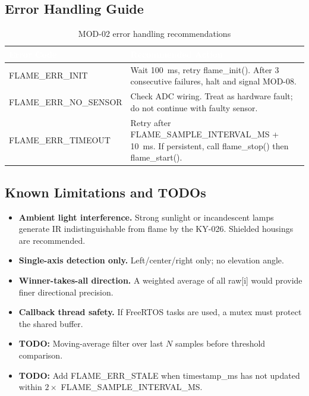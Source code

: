 \documentclass[12pt,a4paper]{article}
\newcommand{\theadtext}[1]{\textcolor{white}{\textbf{#1}}}
\newcommand{\fn}[1]{{\footnotesize\ttfamily #1}}
\begin{document}
\subsection{Error Handling Guide}

\begin{table}[H]\centering\small
\begin{tabularx}{\textwidth}{L{4.5cm} X}
\toprule
{}\theadtext{Error Code} & \theadtext{Recommended Action} \\
\midrule
{}   \fn{FLAME\_ERR\_INIT}       & Wait 100~ms, retry \fn{flame\_init()}. After 3 consecutive failures, halt and signal MOD-08. \\
 \fn{FLAME\_ERR\_NO\_SENSOR} & Check ADC wiring. Treat as hardware fault; do not continue with faulty sensor. \\
   \fn{FLAME\_ERR\_TIMEOUT}    & Retry after \fn{FLAME\_SAMPLE\_INTERVAL\_MS + 10}~ms. If persistent, call \fn{flame\_stop()} then \fn{flame\_start()}. \\
\bottomrule
\end{tabularx}
\caption{MOD-02 error handling recommendations}
\end{table}


\subsection{Known Limitations and TODOs}

\begin{itemize}[leftmargin=1.5em]
  \item \textbf{Ambient light interference.} Strong sunlight or incandescent lamps generate IR indistinguishable from flame by the KY-026. Shielded housings are recommended.
  \item \textbf{Single-axis detection only.} Left/center/right only; no elevation angle.
  \item \textbf{Winner-takes-all direction.} A weighted average of all \fn{raw[i]} would provide finer directional precision.
  \item \textbf{Callback thread safety.} If FreeRTOS tasks are used, a mutex must protect the shared buffer.
  \item \textbf{TODO:} Moving-average filter over last $N$ samples before threshold comparison.
  \item \textbf{TODO:} Add \fn{FLAME\_ERR\_STALE} when \fn{timestamp\_ms} has not updated within $2 \times$ \fn{FLAME\_SAMPLE\_INTERVAL\_MS}.
\end{itemize}
\end{document}
